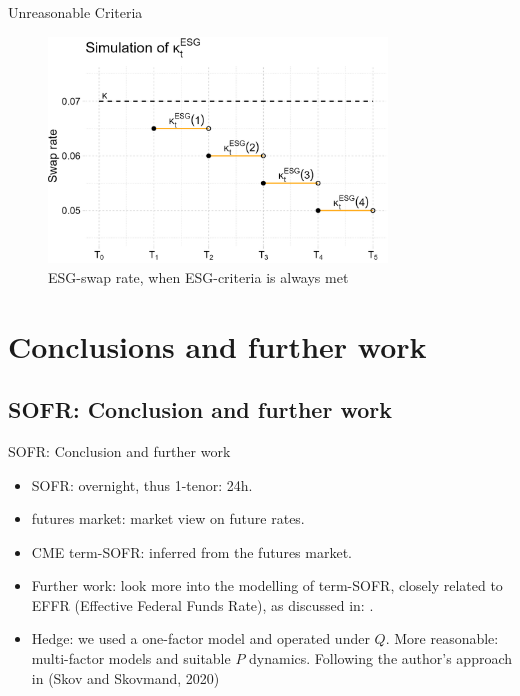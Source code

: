 \documentclass[UKenglish]{beamer}
\begin{document}
\begin{frame}{Unreasonable Criteria}
\begin{figure}[htp]
    \centering
    \includegraphics[width= 9cm]{ESG/kappa_t_ESG_2.png}
    \caption{ESG-swap rate, when ESG-criteria is always met}
    \label{fig: ESG_swap_2}
\end{figure}
\end{frame}


\section{Conclusions and further work}
\SectionPage

\subsection{SOFR: Conclusion and further work}
\begin{frame}{SOFR: Conclusion and further work}
\begin{itemize}
    \item SOFR: overnight, thus 1-tenor: 24h. 
    \item futures market: market view on future rates. 
    \item CME term-SOFR: inferred from the futures market. 
    \item Further work: look more into the modelling of term-SOFR, closely related to EFFR (Effective Federal Funds Rate), as discussed in: \cite{gellert2021short}.  
    \item Hedge: we used a one-factor model and operated under $Q$. More reasonable: multi-factor models and suitable $ P$ dynamics. Following the author's approach in \cite{SS20} (Skov and Skovmand, 2020)
\end{itemize}
\end{frame}
\end{document}
